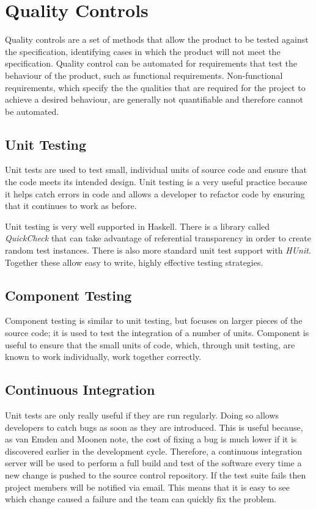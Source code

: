 \section{Quality Controls}
\label{section:quality}

Quality controls are a set of methods that allow the product to be tested against the specification, identifying cases in which the product will not meet the specification.
Quality control can be automated for requirements that test the behaviour of the product, such as functional requirements. Non-functional requirements, which specify the the qualities that are required for the project to achieve a desired behaviour, are generally not quantifiable and therefore cannot be automated.



% 

\subsection{Unit Testing}
Unit tests are used to test small, individual units of source code and ensure that the
code meets its intended design. Unit testing is a very useful practice because it helps
catch errors in code and allows a developer to refactor code by ensuring that it continues
to work as before.

Unit testing is very well supported in Haskell. There is a library called \emph{QuickCheck} that can take advantage of referential transparency in order to create random test instances. There is also more standard unit test support with \emph{HUnit}. Together these allow easy to write, highly effective testing strategies.

\subsection{Component Testing}
Component testing is similar to unit testing, but focuses on larger pieces of the source
code; it is used to test the integration of a number of units. Component is useful to
ensure that the small units of code, which, through unit testing, are known to work
individually, work together correctly.

\subsection{Continuous Integration}
Unit tests are only really useful if they are run regularly. Doing so allows developers
to catch bugs as soon as they are introduced. This is useful because, as van Emden
and Moonen note, the cost of fixing a bug is much lower if it is discovered earlier in
the development cycle.\cite{emden2002} Therefore, a continuous integration server
will be used to perform a full build and test of the software every time a new change
is pushed to the source control repository. If the test suite fails then project members
will be notified via email. This means that it is easy to see which change caused a
failure and the team can quickly fix the problem.

